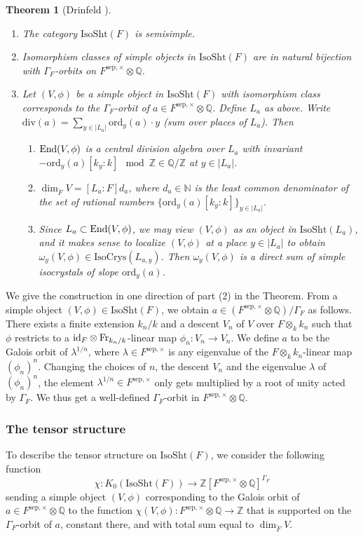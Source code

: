 \documentclass[11pt]{amsart}
\numberwithin{equation}{section}
\theoremstyle{plain}
\newtheorem{theorem}[subsubsection]{Theorem}
\theoremstyle{definition}
\def\NN{\mathbb{N}}
\def\QQ{\mathbb{Q}}
\def\ZZ{\mathbb{Z}}
\newcommand\Fr{\textup{Fr}}
\newcommand\id{\textup{id}}
\newcommand\End{\textup{End}}
\newcommand\sss{\subsubsection}
\newcommand\ot{\otimes}
\newcommand\G\Gamma
\renewcommand{\l}{\lambda}
\newcommand{\om}{\omega}
\newcommand{\br}{\breve}
\newcommand{\IsoSht}{\mathrm{IsoSht}}
\newcommand{\IsoCrys}{\mathrm{IsoCrys}}
\newcommand{\sep}{\mathrm{sep}}
\renewcommand{\div}{\mathrm{div}}
\newcommand{\ord}{\mathrm{ord}}
\begin{document}
\begin{theorem}[Drinfeld \cite{Dr-Pet}]\label{th:isoSht}
\begin{enumerate}
\item The category $\IsoSht(F)$ is semisimple.
\item Isomorphism classes of simple objects in $\IsoSht(F)$ are in natural bijection with $\G_{F}$-orbits on $F^{\sep,\times}\ot\QQ$.
\item Let $(V,\phi)$ be a simple object in $\IsoSht(F)$ with isomorphism class corresponds to the $\G_{F}$-orbit of $a\in F^{\sep,\times}\ot\QQ$. Define $L_{a}$ as above. Write $\div(a)=\sum_{y\in |L_{a}|}\ord_{y}(a)\cdot y$ (sum over places of $L_{a}$). Then 
\begin{enumerate}
\item $\End(V,\phi)$ is a central division algebra over $L_{a}$ with invariant $-\ord_{y}(a)[k_{y}:k]\mod \ZZ\in \QQ/\ZZ$ at $y\in |L_{a}|$. 
\item $\dim_{\br F}V=[L_{a}:F]d_{a}$, where $d_{a}\in \NN$ is the least common denominator of the set of rational numbers $\{\ord_{y}(a)[k_{y}:k]\}_{y\in |L_{a}|}$.
\item Since $L_{a}\subset \End(V,\phi)$, we may view $(V,\phi)$ as an object in $\IsoSht(L_{a})$, and it makes sense to localize $(V,\phi)$ at a place  $y\in |L_{a}|$ to obtain $\om_{y}(V,\phi)\in \IsoCrys(L_{a,y})$. Then $\om_{y}(V,\phi)$ is a direct sum of simple isocrystals of slope $\ord_{y}(a)$.
\end{enumerate}

\end{enumerate}
\end{theorem}

We give the construction in one direction of part (2) in the Theorem. From a simple object $(V,\phi)\in \IsoSht(F)$, we obtain $a\in (F^{\sep,\times}\ot\QQ)/\G_{F}$ as follows. There exists a finite extension $k_{n}/k$ and a descent $V_{n}$ of   $V$ over $F\ot_{k}k_{n}$ such that $\phi$ restricts to a $\id_{F}\ot \Fr_{k_{n}/k}$-linear map $\phi_{n}: V_{n}\to V_{n}$. We define $a$ to be the Galois orbit of $\l^{1/n}$, where $\l\in F^{\sep,\times}$ is any eigenvalue of the $F\ot_{k}k_{n}$-linear map $(\phi_{n})^{n}$. Changing the choices of $n$, the descent $V_{n}$ and the eigenvalue $\l$ of $(\phi_{n})^{n}$, the element $\l^{1/n}\in F^{\sep, \times}$ only gets multiplied by a root of unity acted by $\G_{F}$. We thus get a well-defined $\G_{F}$-orbit in $F^{\sep,\times}\ot\QQ$.

\sss{The tensor structure} To describe the tensor structure on $\IsoSht(F)$, we consider the following function
\begin{equation*}
\chi: K_{0}(\IsoSht(F))\to \ZZ[F^{\sep, \times}\ot\QQ]^{\G_{F}}
\end{equation*}
sending a simple object $(V,\phi)$ corresponding to the Galois orbit of $a\in F^{\sep,\times}\ot\QQ$ to the function $\chi(V,\phi): F^{\sep, \times}\ot\QQ\to \ZZ$ that is supported on the $\G_{F}$-orbit of $a$, constant there, and with total sum equal to $\dim_{\br F} V$. 
\end{document}
